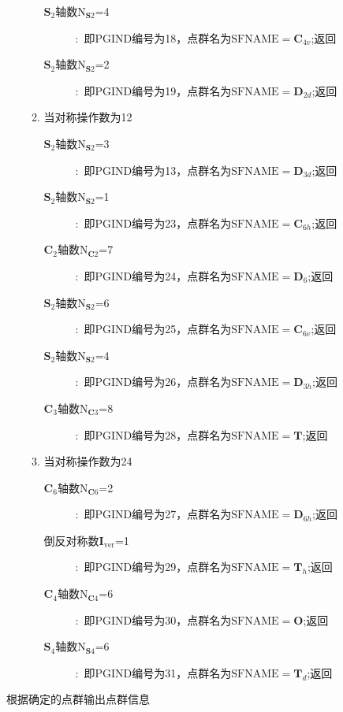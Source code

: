 \documentclass{article}      %
\begin{document}
\begin{enumerate}
\begin{enumerate}
\begin{description}
			\item[$\mathbf{S}_2$轴数$\mathrm{N}_{\mathbf{S}2}$=4]:~即\textrm{PGIND}编号为18，点群名为$\mathrm{SFNAME}=\mathbf{C}_{4v}$;返回
			\item[$\mathbf{S}_2$轴数$\mathrm{N}_{\mathbf{S}2}$=2]:~即\textrm{PGIND}编号为19，点群名为$\mathrm{SFNAME}=\mathbf{D}_{2d}$;返回
		\end{description}
			\item 当对称操作数为12
		\begin{description}
			\item[$\mathbf{S}_2$轴数$\mathrm{N}_{\mathbf{S}2}$=3]:~即\textrm{PGIND}编号为13，点群名为$\mathrm{SFNAME}=\mathbf{D}_{3d}$;返回
			\item[$\mathbf{S}_2$轴数$\mathrm{N}_{\mathbf{S}2}$=1]:~即\textrm{PGIND}编号为23，点群名为$\mathrm{SFNAME}=\mathbf{C}_{6h}$;返回
			\item[$\mathbf{C}_2$轴数$\mathrm{N}_{\mathbf{C}2}$=7]:~即\textrm{PGIND}编号为24，点群名为$\mathrm{SFNAME}=\mathbf{D}_6$;返回
			\item[$\mathbf{S}_2$轴数$\mathrm{N}_{\mathbf{S}2}$=6]:~即\textrm{PGIND}编号为25，点群名为$\mathrm{SFNAME}=\mathbf{C}_{6v}$;返回
			\item[$\mathbf{S}_2$轴数$\mathrm{N}_{\mathbf{S}2}$=4]:~即\textrm{PGIND}编号为26，点群名为$\mathrm{SFNAME}=\mathbf{D}_{3h}$;返回
			\item[$\mathbf{C}_3$轴数$\mathrm{N}_{\mathbf{C}3}$=8]:~即\textrm{PGIND}编号为28，点群名为$\mathrm{SFNAME}=\mathbf{T}$;返回
		\end{description}
			\item 当对称操作数为24
		\begin{description}
			\item[$\mathbf{C}_6$轴数$\mathrm{N}_{\mathbf{C}6}$=2]:~即\textrm{PGIND}编号为27，点群名为$\mathrm{SFNAME}=\mathbf{D}_{6h}$;返回
			\item[倒反对称数$\mathbf{I}_{\mathrm{ver}}$=1]:~即\textrm{PGIND}编号为29，点群名为$\mathrm{SFNAME}=\mathbf{T}_{h}$;返回
			\item[$\mathbf{C}_4$轴数$\mathrm{N}_{\mathbf{C}4}$=6]:~即\textrm{PGIND}编号为30，点群名为$\mathrm{SFNAME}=\mathbf{O}$;返回
			\item[$\mathbf{S}_4$轴数$\mathrm{N}_{\mathbf{S}4}$=6]:~即\textrm{PGIND}编号为31，点群名为$\mathrm{SFNAME}=\mathbf{T}_{d}$;返回
		\end{description}
		\end{enumerate}
\end{enumerate}
根据确定的点群输出点群信息
\end{document}
